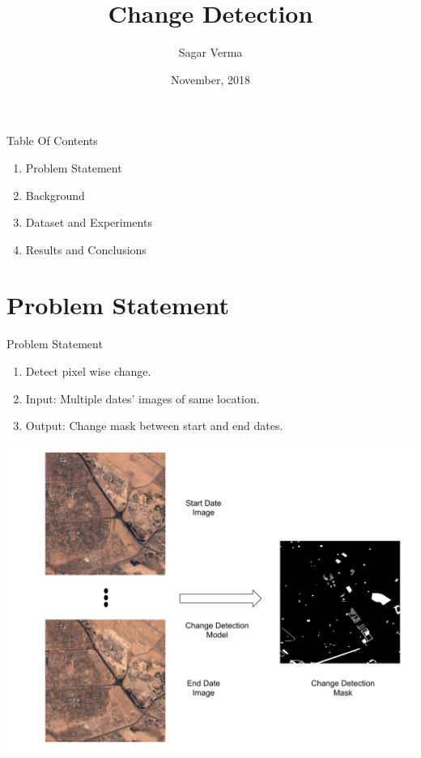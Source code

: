 \documentclass[handout]{beamer}
\title[ \insertdate]{Change Detection}
\author{Sagar Verma}
\institute[Granular AI] %
{
24 Stony Brook Road
Belmont MA, 02478 USA}
\date{November, 2018}
\begin{document}
\begin{frame}
\titlepage
\end{frame}

\begin{frame}{Table Of Contents}
\begin{enumerate}
\item Problem Statement
\item Background
\item Dataset and Experiments
\item Results and Conclusions
\end{enumerate}
\end{frame}

\section{Problem Statement}

\begin{frame}{Problem Statement}
\begin{center}
\begin{enumerate}
  \item Detect pixel wise change.
  \item Input: Multiple dates' images of same location.
  \item Output: Change mask between start and end dates.
\end{enumerate}
\vspace{.5cm}
  \includegraphics[scale=0.25]{images/cdteaser}
\end{center}
\end{frame}
\end{document}
